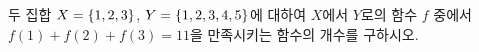 두 집합 $X=\{1{,}\mkern3mu\mathopen{}2{,}\mkern3mu\mathopen{}3\}$, $Y=\{1{,}\mkern3mu\mathopen{}2{,}\mkern3mu\mathopen{}3{,}\mkern3mu\mathopen{}4{,}\mkern3mu\mathopen{}5\}$에 대하여 $X$에서 $Y$로의 함수 $f$ 중에서 $f(1)+f(2)+f(3)=11$을 만족시키는 함수의 개수를 구하시오.
